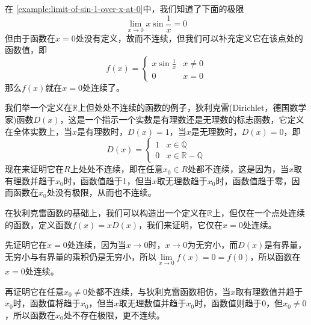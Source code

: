 \begin{example}
  在 \autoref{example:limit-of-sin-1-over-x-at-0}中，我们知道了下面的极限
  \[ \lim_{x \to 0} x\sin{\frac{1}{x}} = 0 \]
  但由于函数在$x=0$处没有定义，故而不连续，但我们可以补充定义它在该点处的函数值，即
  \[ f(x) =
    \begin{cases}
      x \sin{\frac{1}{x}} & x \neq 0 \\
      0 & x=0
    \end{cases}
  \]
  那么$f(x)$就在$x=0$处连续了。
\end{example}


\begin{example}
  我们举一个定义在$\mathbb{R}$上但处处不连续的函数的例子，狄利克雷(Dirichlet，德国数学家)函数$D(x)$，这是一个指示一个实数是有理数还是无理数的标志函数，它定义在全体实数上，当$x$是有理数时，$D(x)=1$，当$x$是无理数时，$D(x)=0$，即
  \[
    D(x) =
    \begin{cases}
      1 & x \in \mathbb{Q} \\
      0 & x \in \mathbb{R}-\mathbb{Q}
    \end{cases}
  \]
  现在来证明它在$R$上处处不连续，即在任意$x_0 \in R$处都不连续，这是因为，当$x$取有理数并趋于$x_0$时，函数值趋于1，但当$x$取无理数趋于$x_0$时，函数值趋于零，因而函数在$x_0$处没有极限，从而也不连续。
\end{example}

\begin{example}
  \label{example:function-with-continuous-at-single-point}
  在狄利克雷函数的基础上，我们可以构造出一个定义在$\mathbb{R}$上，但仅在一个点处连续的函数，定义函数$f(x)=xD(x)$，我们来证明，它仅在$x=0$处连续。

  先证明它在$x=0$处连续，因为当$x \to 0$时，$x \to 0$为无穷小，而$D(x)$是有界量，无穷小与有界量的乘积仍是无穷小，所以$\lim\limits_{x \to 0} f(x)=0=f(0)$，所以函数在$x=0$处连续。

  再证明它在任意$x_0 \neq 0$处都不连续，与狄利克雷函数相仿，当$x$取有理数值并趋于$x_0$时，函数值将趋于$x_0$，但当$x$取无理数值并趋于$x_0$时，函数值则趋于$0$，但$x_0 \neq 0$，所以函数在$x_0$处不存在极限，更不连续。
\end{example}

